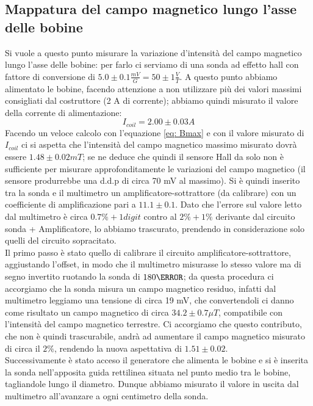 \documentclass[10pt, a4paper, italian]{article}
\begin{document}
\subsection{Mappatura del campo magnetico lungo l'asse delle bobine}
Si vuole a questo punto misurare la variazione d'intensità del campo magnetico lungo l'asse delle bobine: per farlo ci serviamo di una sonda ad effetto hall con fattore di conversione di $5.0 \pm 0.1 \frac{mV}{G} = 50 \pm 1 \frac{V}{T}$.
A questo punto abbiamo alimentato le bobine, facendo attenzione a non utilizzare più dei valori massimi consigliati dal costruttore (2 A di corrente); abbiamo quindi misurato il valore della corrente di alimentazione:
\[
I_{coil}=2.00 \pm 0.03 A
\]
Facendo un veloce calcolo con l'equazione \ref{eq: Bmax} e con il valore misurato di $I_{coil}$ ci si aspetta che l'intensità del campo magnetico massimo misurato dovrà essere $1.48 \pm 0.02 \si{mT}$; se ne deduce che quindi il sensore Hall da solo non è sufficiente per misurare approfonditamente le variazioni del campo magnetico (il sensore produrrebbe una d.d.p di circa 70 mV al massimo).
Si è quindi inserito tra la sonda e il multimetro un amplificatore-sottrattore (da calibrare) con un coefficiente di amplificazione pari a $11.1 \pm 0.1$.
Dato che l'errore sul valore letto dal multimetro è circa $0.7 \percent + 1 digit$ contro al $2 \percent + 1 \percent$ derivante dal circuito sonda + Amplificatore, lo abbiamo trascurato, prendendo in considerazione solo quelli del circuito sopracitato.\\
Il primo passo è stato quello di calibrare il circuito amplificatore-sottrattore, aggiustando l'offset, in modo che il multimetro misurasse lo stesso valore ma di segno invertito ruotando la sonda di $180 \degree$; da questa procedura ci accorgiamo che la sonda misura un campo magnetico residuo, infatti dal multimetro leggiamo una tensione di circa 19 mV, che convertendoli ci danno come risultato un campo magnetico di circa $34.2 \pm 0.7 \mu T$, compatibile con l'intensità del campo magnetico terrestre. Ci accorgiamo che questo contributo, che non è quindi trascurabile, andrà ad aumentare il campo magnetico misurato di circa il $2 \percent$, rendendo la nuova aspettativa di $1.51 \pm 0.02$.\\
Successivamente è stato acceso il generatore che alimenta le bobine e si è inserita la sonda nell'apposita guida rettilinea situata nel punto medio tra le bobine, tagliandole lungo il diametro. Dunque abbiamo misurato il valore in uscita dal multimetro all'avanzare a ogni centimetro della sonda.
\end{document}
